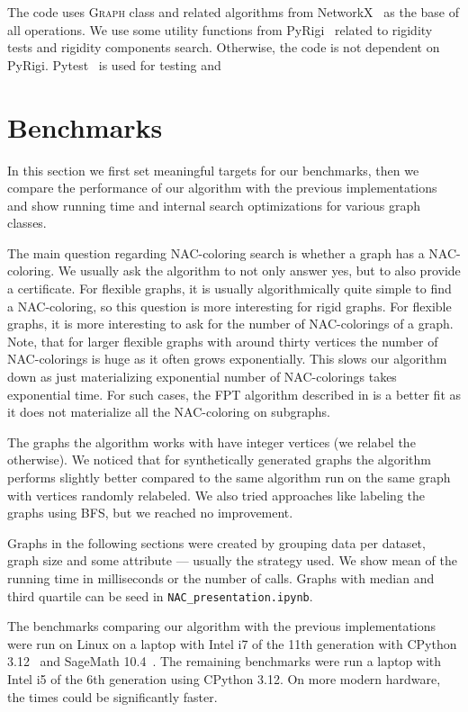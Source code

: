 The code uses \textsc{Graph} class and related algorithms from NetworkX~\cite{networkx}
as the base of all operations. We use some utility functions from PyRigi~\cite{pyrigi}
related to rigidity tests and rigidity components search.
Otherwise, the code is not dependent on PyRigi.
Pytest~\cite{pytest} is used for testing and

\section{Benchmarks}

In this section we first set meaningful targets for our benchmarks,
then we compare the performance of our algorithm with the previous implementations
and show running time and internal search optimizations for various graph classes.

The main question regarding NAC-coloring search is whether a graph has a NAC-coloring.
We usually ask the algorithm to not only answer yes, but to also provide a certificate.
For flexible graphs, it is usually algorithmically quite simple to find a NAC-coloring,
so this question is more interesting for rigid graphs.
For flexible graphs, it is more interesting to ask for the number of NAC-colorings
of a graph.
Note, that for larger flexible graphs with around thirty vertices
the number of NAC-colorings is huge as it often grows exponentially.
This slows our algorithm down as just materializing exponential
number of NAC-colorings takes exponential time.
For such cases, the FPT algorithm described in 
is a better fit as it does not materialize all the NAC-coloring on subgraphs.

The graphs the algorithm works with have integer vertices (we relabel the otherwise).
We noticed that for synthetically generated graphs the algorithm performs
slightly better compared to the same algorithm run on the same graph with
vertices randomly relabeled.
We also tried approaches like labeling the graphs using BFS,
but we reached no improvement.

Graphs in the following sections were created by grouping data per dataset,
graph size and some attribute --- usually the strategy used.
We show mean of the running time in milliseconds or
the number of \IsNACColoring{} calls.
Graphs with median and third quartile can be seed in \texttt{NAC\_presentation.ipynb}.

The benchmarks comparing our algorithm with the previous implementations
were run on Linux on a laptop with Intel i7 of the 11th generation
with CPython 3.12~\cite{cpython} and SageMath 10.4~\cite{sagemath}.
The remaining benchmarks were run a laptop with Intel i5 of the 6th generation
using CPython 3.12.
On more modern hardware, the times could be significantly faster.

